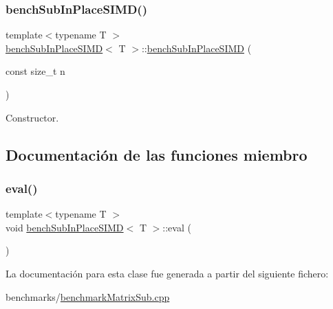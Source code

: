 \subsubsection{\texorpdfstring{bench\+Sub\+In\+Place\+S\+I\+M\+D()}{benchSubInPlaceSIMD()}}
{\footnotesize\ttfamily template$<$typename T $>$ \\
\hyperlink{classbenchSubInPlaceSIMD}{bench\+Sub\+In\+Place\+S\+I\+MD}$<$ T $>$\+::\hyperlink{classbenchSubInPlaceSIMD}{bench\+Sub\+In\+Place\+S\+I\+MD} (\begin{DoxyParamCaption}\item[{const size\+\_\+t}]{n }\end{DoxyParamCaption})\hspace{0.3cm}{\ttfamily [inline]}}



Constructor. 



\subsection{Documentación de las funciones miembro}
\mbox{\label{classbenchSubInPlaceSIMD_a1a00a92a8592c8baa781cf377f6d63be}} 
\subsubsection{\texorpdfstring{eval()}{eval()}}
{\footnotesize\ttfamily template$<$typename T $>$ \\
void \hyperlink{classbenchSubInPlaceSIMD}{bench\+Sub\+In\+Place\+S\+I\+MD}$<$ T $>$\+::eval (\begin{DoxyParamCaption}{ }\end{DoxyParamCaption})\hspace{0.3cm}{\ttfamily [inline]}}



La documentación para esta clase fue generada a partir del siguiente fichero\+:\begin{DoxyCompactItemize}
\item 
benchmarks/\hyperlink{benchmarkMatrixSub_8cpp}{benchmark\+Matrix\+Sub.\+cpp}\end{DoxyCompactItemize}
